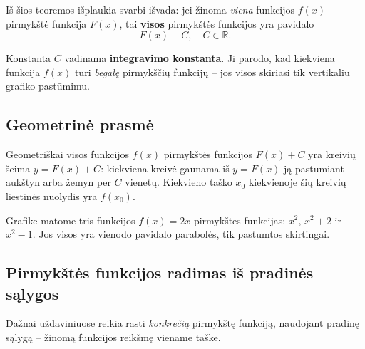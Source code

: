 Iš šios teoremos išplaukia svarbi išvada: jei žinoma \emph{viena} funkcijos $f(x)$ pirmykštė funkcija
$F(x)$, tai \textbf{visos} pirmykštės funkcijos yra pavidalo
\[
    F(x) + C, \quad C \in \mathbb{R}.
\]

\begin{remark}
Konstanta $C$ vadinama \textbf{integravimo konstanta}. Ji parodo, kad kiekviena funkcija $f(x)$
turi \emph{begalę} pirmykščių funkcijų -- jos visos skiriasi tik vertikaliu grafiko pastūmimu.
\end{remark}

\subsection*{Geometrinė prasmė}

Geometriškai visos funkcijos $f(x)$ pirmykštės funkcijos $F(x)+C$ yra kreivių šeima
$y = F(x) + C$: kiekviena kreivė gaunama iš $y = F(x)$ ją pastumiant aukštyn arba žemyn per
$C$ vienetų. Kiekvieno taško $x_0$ kiekvienoje šių kreivių liestinės nuolydis yra
$f(x_0)$.

\begin{center}
\end{center}

Grafike matome tris funkcijos $f(x)=2x$ pirmykštes funkcijas: $x^2$, $x^2+2$ ir $x^2-1$.
Jos visos yra vienodo pavidalo parabolės, tik pastumtos skirtingai.

\subsection*{Pirmykštės funkcijos radimas iš pradinės sąlygos}

Dažnai uždaviniuose reikia rasti \emph{konkrečią} pirmykštę funkciją, naudojant pradinę sąlygą --
žinomą funkcijos reikšmę viename taške.

